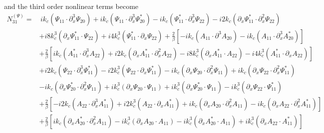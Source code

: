 \documentclass{emulateapj}
\newcommand{\beq}{\begin{equation}}
\newcommand{\eeq}{\end{equation}}
\begin{document}
and the third order nonlinear terms become \\

\beq
\begin{split}
N_{31}^{(\Psi)} = &  \, i k_c \left(\Psi_{11} \cdot \partial_x^3 \Psi_{20}\right) + i k_c \left(\Psi_{11} \cdot \partial_x^3\Psi_{20}^*\right) - i k_c \left(\Psi_{11}^* \cdot \partial_x^3 \Psi_{22}\right) - i 2 k_c \left(\partial_x \Psi_{11}^* \cdot \partial_x^2 \Psi_{22}\right) \\
& + i 8 k_c^3 \left(\partial_x\Psi_{11}^* \cdot \Psi_{22}\right) + i 4 k_c^3 \left(\Psi_{11}^* \cdot \partial_x \Psi_{22}\right) + \frac{2}{\beta}\left[ - i k_c \left(A_{11} \cdot \partial^3 A_{20}\right) - i k_c \left(A_{11} \cdot \partial_x^3 A_{20}^*\right) \right]\\
& + \frac{2}{\beta}\left[i k_c \left(A_{11}^* \cdot \partial_x^3 A_{22}\right) + i 2 k_c \left(\partial_x A_{11}^* \cdot \partial_x^2 A_{22}\right) - i 8 k_c^3 \left(\partial_x A_{11}^* \cdot A_{22}\right) - i 4 k_c^3 \left(A_{11}^* \cdot \partial_x A_{22}\right)\right] \\
& + i 2 k_c \left(\Psi_{22} \cdot \partial_x^3 \Psi_{11}^*\right) - i 2 k_c^3\left(\Psi_{22} \cdot \partial_x \Psi_{11}^* \right) - i k_c \left(\partial_x \Psi_{20} \cdot \partial_x^2 \Psi_{11}\right) + i k_c \left(\partial_x \Psi_{22} \cdot \partial_x^2 \Psi_{11}^*\right) \\
& - i k_c \left(\partial_x \Psi_{20}^* \cdot \partial_x^2 \Psi_{11}\right) + i k_c^3 \left(\partial_x \Psi_{20} \cdot \Psi_{11}\right) + i k_c^3 \left(\partial_x \Psi_{20}^* \cdot \Psi_{11}\right) - i k_c^3 \left(\partial_x \Psi_{22} \cdot \Psi_{11}^*\right) \\
& + \frac{2}{\beta} \left[ - i 2 k_c \left(A_{22} \cdot \partial_x^3 A_{11}^*\right) + i 2 k_c^3 \left(A_{22} \cdot \partial_x A_{11}^*\right) + i k_c \left(\partial_x A_{20} \cdot \partial_x^2 A_{11}\right) - i k_c \left(\partial_x A_{22} \cdot \partial_x^2 A_{11}^*\right) \right] \\
& + \frac{2}{\beta} \left[ i k_c \left(\partial_x A_{20}^* \cdot \partial_x^2 A_{11}\right) - i k_c^3 \left(\partial_x A_{20} \cdot A_{11}\right) - i k_c^3 \left(\partial_x A_{20}^* \cdot A_{11}\right) + i k_c^3 \left(\partial_x A_{22} \cdot A_{11}^*\right)\right]
\end{split}
\eeq
\end{document}
